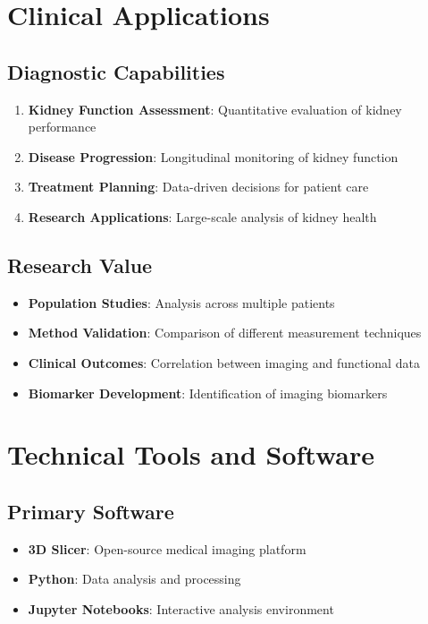 \documentclass{article}
\begin{document}
\section{Clinical Applications}

\subsection{Diagnostic Capabilities}
\begin{enumerate}
    \item \textbf{Kidney Function Assessment}: Quantitative evaluation of kidney performance
    \item \textbf{Disease Progression}: Longitudinal monitoring of kidney function
    \item \textbf{Treatment Planning}: Data-driven decisions for patient care
    \item \textbf{Research Applications}: Large-scale analysis of kidney health
\end{enumerate}

\subsection{Research Value}
\begin{itemize}
    \item \textbf{Population Studies}: Analysis across multiple patients
    \item \textbf{Method Validation}: Comparison of different measurement techniques
    \item \textbf{Clinical Outcomes}: Correlation between imaging and functional data
    \item \textbf{Biomarker Development}: Identification of imaging biomarkers
\end{itemize}

\section{Technical Tools and Software}

\subsection{Primary Software}
\begin{itemize}
    \item \textbf{3D Slicer}: Open-source medical imaging platform
    \item \textbf{Python}: Data analysis and processing
    \item \textbf{Jupyter Notebooks}: Interactive analysis environment
\end{itemize}
\end{document}
